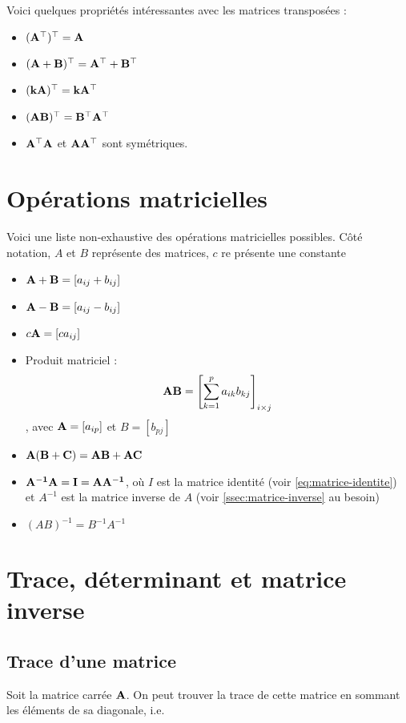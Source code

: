Voici quelques propriétés intéressantes avec les matrices transposées : 
\begin{itemize}
  \item $\mathbf{(A^\top)^\top = A}$
  \item $\mathbf{(A+B)^\top = A^\top + B^\top}$
  \item $\mathbf{(kA)^\top = kA^\top}$
  \item $\mathbf{(AB)^\top = B^\top A^\top}$
  \item $\mathbf{A^\top A}$ et $\mathbf{A A^\top}$ sont symétriques.
\end{itemize}

\section{Opérations matricielles} Voici une liste non-exhaustive des opérations matricielles possibles. Côté notation, $A$ et $B$ représente des matrices, $c$ re présente une constante
\begin{itemize}
\item $\mathbf{A + B}  = [a_{ij} + b_{ij}]$
\item $\mathbf{A - B}  = [a_{ij} - b_{ij}]$
\item $c\mathbf{A}   = [ca_{ij}]$
\item Produit matriciel :
\begin{equation}
\label{eq:produit-matriciel}
\mathbf{AB}   = \left[ \sum_{k=1}^p a_{ik} b_{kj}  \right]_{i \times j}
\end{equation}
,  avec $\mathbf{A}=[a_{ip}]$ et $B = [b_{pj}]$
\item $\mathbf{A(B +C) = AB + AC}$
\item $\mathbf{A^{-1} A = I =A A^{-1}}$, où $I$ est la matrice identité (voir \autoref{eq:matrice-identite}) et $A^{-1}$ est la matrice inverse de $A$ (voir \autoref{ssec:matrice-inverse} au besoin)
\item $(AB)^{-1} = B^{-1} A^{-1}$
\end{itemize}






\section{Trace, déterminant et matrice inverse}
\subsection{Trace d'une matrice}
\label{ssec:trace-matrice}
Soit la matrice carrée $\mathbf{A}$. On peut trouver la trace de cette matrice en sommant les éléments de sa diagonale, i.e.


